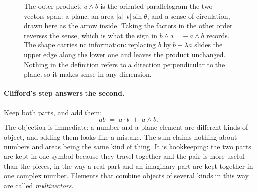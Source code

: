 \documentclass[11pt]{article}
\theoremstyle{plain}
\theoremstyle{definition}
\begin{document}
\begin{figure}[ht]
\centering
{}
\caption{The outer product. $a \wedge b$ is the oriented parallelogram the two vectors span: a plane, an area $|a|\,|b|\sin\theta$, and a sense of circulation, drawn here as the arrow inside. Taking the factors in the other order reverses the sense, which is what the sign in $b \wedge a = -\,a \wedge b$ records. The shape carries no information: replacing $b$ by $b + \lambda a$ slides the upper edge along the lower one and leaves the product unchanged. Nothing in the definition refers to a direction perpendicular to the plane, so it makes sense in any dimension.}
\label{fig:wedge}
\end{figure}

\paragraph{Clifford's step answers the second.} Keep both parts, and add them:
\[
ab \;=\; a \cdot b \;+\; a \wedge b .
\]
The objection is immediate: a number and a plane element are different kinds of object, and adding them looks like a mistake. The sum claims nothing about numbers and areas being the same kind of thing. It is bookkeeping: the two parts are kept in one symbol because they travel together and the pair is more useful than the pieces, in the way a real part and an imaginary part are kept together in one complex number. Elements that combine objects of several kinds in this way are called \emph{multivectors}.
\end{document}
